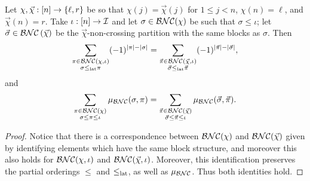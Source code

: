 \begin{lemma}
	\label{lem:bifreeltor}
	Let $\chi, \vec\chi : [n] \to \left\{\ell, r\right\}$ be so that $\chi(j) = \vec\chi(j)$ for $1\leq j < n$, $\chi(n) = \ell$, and $\vec\chi(n) = r$.
	Take $\iota : [n] \to \mathcal{I}$ and let $\sigma \in \mathcal{BNC}(\chi)$ be such that $\sigma \leq \iota$; let $\vec\sigma \in \mathcal{BNC}\left(\vec\chi\right)$ be the $\vec\chi$-non-crossing partition with the same blocks as $\sigma$.
	Then
	$$\sum_{\substack{\pi\in\mathcal{BNC}(\chi, \iota)\\\sigma\leq_{{\operatorname{lat}}}\pi}} (-1)^{\left|\pi\right| - \left|\sigma\right|}
	= \sum_{\substack{\vec\pi \in \mathcal{BNC}(\vec\chi, \iota) \\ \vec\sigma \leq_{{\operatorname{lat}}} \vec\pi}} (-1)^{\left|\vec\pi\right|-\left|\vec\sigma\right|},$$
	and
	$$\sum_{\substack{\pi \in \mathcal{BNC}(\chi) \\ \sigma \leq \pi \leq \iota}} \mu_{\mathcal{BNC}}(\sigma, \pi)
	= \sum_{\substack{\vec\pi \in \mathcal{BNC}(\vec\chi) \\ \vec\sigma \leq \vec\pi \leq \iota}} \mu_{\mathcal{BNC}}(\vec\sigma, \vec\pi).$$
\end{lemma}


\begin{proof}
	Notice that there is a correspondence between $\mathcal{BNC}(\chi)$ and $\mathcal{BNC}(\vec\chi)$ given by identifying elements which have the same block structure, and moreover this also holds for $\mathcal{BNC}(\chi, \iota)$ and $\mathcal{BNC}(\vec\chi, \iota)$.
	Moreover, this identification preserves the partial orderings $\leq$ and $\leq_{{\operatorname{lat}}}$, as well as $\mu_{\mathcal{BNC}}$.
	Thus both identities hold.
\end{proof}


